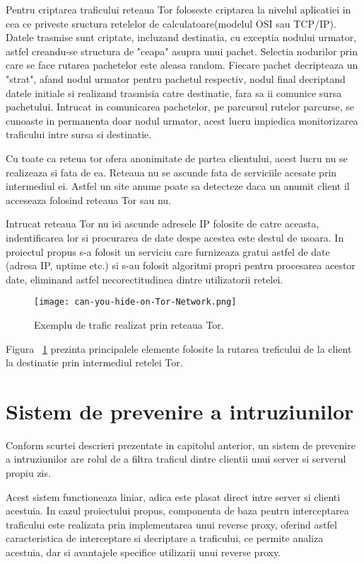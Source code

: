 Pentru criptarea traficului reteaua Tor foloseste criptarea la nivelul aplicatiei in cea ce priveste sructura retelelor de calculatoare(modelul OSI sau TCP/IP). Datele trasmise sunt criptate, incluzand destinatia, cu exceptia nodului urmator, astfel creandu-se structura de "ceapa" asupra unui pachet. Selectia nodurilor prin care se face rutarea pachetelor este aleasa random. Fiecare pachet decripteaza un "strat", afand nodul urmator pentru pachetul respectiv, nodul final decriptand datele initiale si realizand trasmisia catre destinatie, fara sa ii comunice sursa pachetului. Intrucat in comunicarea pachetelor, pe parcursul rutelor parcurse, se cunoaste in permanenta doar nodul urmator, acest lucru impiedica monitorizarea traficului intre sursa si destinatie.


Cu toate ca reteua tor ofera anonimitate de partea clientului, acest lucru nu se realizeaza si fata de ea. Reteaua nu se ascunde fata de serviciile acesate prin intermediul ei. Astfel un site anume poate sa detecteze daca un anumit client il acceseaza folosind reteaua Tor sau nu.

Intrucat reteaua Tor nu isi ascunde adresele IP folosite de catre aceasta, indentificarea lor si procurarea de date despe acestea este destul de usoara. In proiectul propus s-a folosit un serviciu care furnizeaza gratui astfel de date \cite{tot_status}(adresa IP, uptime etc.) si s-au folosit algoritmi propri pentru procesarea acestor date, eliminand astfel necorectitudinea dintre utilizatorii retelei.

\begin{figure}[h]
	\centering
	\texttt{[image: can-you-hide-on-Tor-Network.png]}
	\caption{Exemplu de trafic realizat prin reteaua Tor.}
	\label{fig:tor-example}
\end{figure}

Figura ~\ref{fig:tor-example} prezinta principalele elemente folosite la rutarea treficului de la client la destinatie prin intermediul retelei Tor. \\


\section{Sistem de prevenire a intruziunilor}
Conform scurtei descrieri prezentate in capitolul anterior, un sistem de prevenire a intruziunilor are rolul de a filtra traficul dintre clientii unui server si serverul propiu zis. 

Acest sistem functioneaza liniar, adica este plasat direct intre server si clienti acestuia. In cazul proiectului propus, componenta de baza pentru interceptarea traficului este realizata prin implementarea unui reverse proxy, oferind astfel caracteristica de interceptare si decriptare a traficului, ce permite analiza acestuia, dar si avantajele specifice utilizarii unui reverse proxy.

